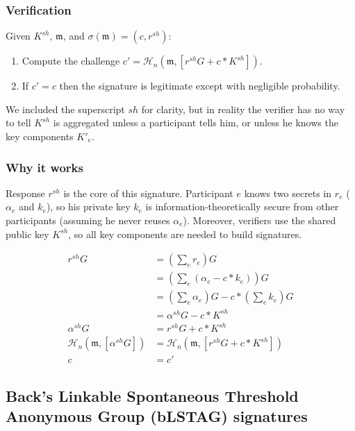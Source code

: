 \subsubsection*{Verification}

Given $K^{sh}$, $\mathfrak{m}$, and $\sigma(\mathfrak{m}) = (c,r^{sh})$:

\begin{enumerate}
    \item Compute the challenge $c' = \mathcal{H}_n(\mathfrak{m},[r^{sh} G + c*K^{sh}])$.
    \item If $c' = c$ then the signature is legitimate except with negligible probability.
\end{enumerate}

We included the superscript $sh$ for clarity, but in reality the verifier has no way to tell $K^{sh}$ is aggregated unless a participant tells him, or unless he knows the key components $K'_e$.

\subsubsection*{Why it works}

Response $r^{sh}$ is the core of this signature. Participant $e$ knows two secrets in $r_e$ ($\alpha_e$ and $k_e$), so his private key $k_e$ is information-theoretically secure from other participants (assuming he never reuses $\alpha_e$). Moreover, verifiers use the shared public key $K^{sh}$, so all key components are needed to build signatures.

\begin{align*}
    r^{sh} G &= (\sum_e r_e) G \\
      &= (\sum_e (\alpha_e - c*k_e)) G \\
      &= (\sum_e \alpha_e) G - c*(\sum_e k_e) G \\
      &= \alpha^{sh} G - c*K^{sh} \\
    \alpha^{sh} G &= r^{sh} G + c*K^{sh} \\
    \mathcal{H}_n(\mathfrak{m},[\alpha^{sh} G]) &= \mathcal{H}_n(\mathfrak{m},[r^{sh} G + c*K^{sh}]) \\
    c &= c'
\end{align*}


\subsection{Back's Linkable Spontaneous Threshold Anonymous Group (bLSTAG) signatures}
\label{sec:bLSTAG}

